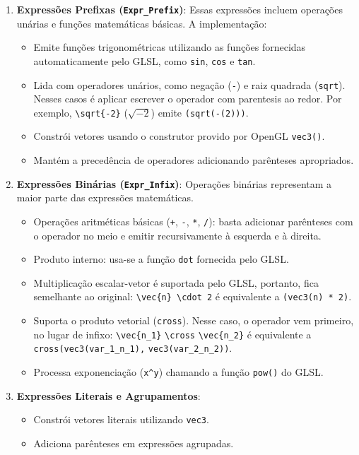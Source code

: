 \begin{enumerate}
    \item \textbf{Expressões Prefixas (\texttt{Expr\_Prefix})}:
    Essas expressões incluem operações unárias e funções matemáticas básicas. A implementação:
    \begin{itemize}
        \item Emite funções trigonométricas utilizando as funções fornecidas automaticamente pelo GLSL, como \verb|sin|, \verb|cos| e \verb|tan|.
        \item Lida com operadores unários, como negação (\verb|-|) e raiz quadrada (\verb|sqrt|). Nesses casos é aplicar escrever o operador com parentesis ao redor. Por exemplo, \verb"\sqrt{-2}" ($\sqrt{-2}$) emite \verb"(sqrt(-(2)))".
        \item Constrói vetores usando o construtor provido por OpenGL \verb|vec3()|.
        \item Mantém a precedência de operadores adicionando parênteses apropriados.
    \end{itemize}

    \item \textbf{Expressões Binárias (\texttt{Expr\_Infix})}:
    Operações binárias representam a maior parte das expressões matemáticas.
    \begin{itemize}
    \item Operações aritméticas básicas (\verb|+|, \verb|-|, \verb|*|, \verb|/|): basta adicionar parênteses com o operador no meio e emitir recursivamente à esquerda e à direita.
    \item Produto interno: usa-se a função \verb|dot| fornecida pelo GLSL.
    \item Multiplicação escalar-vetor é suportada pelo GLSL, portanto, fica semelhante ao original: \verb|\vec{n} \cdot 2| é equivalente a \verb|(vec3(n) * 2)|.
    \item Suporta o produto vetorial (\verb|cross|). Nesse caso, o operador vem primeiro, no lugar de infixo: \verb|\vec{n_1}| \verb"\cross" \verb"\vec{n_2}" é  equivalente a  \verb|cross(vec3(var_1_n_1),| \verb|vec3(var_2_n_2))|.
    \item Processa exponenciação (\verb|x^y|) chamando a função \verb|pow()| do GLSL.
    \end{itemize}

    \item \textbf{Expressões Literais e Agrupamentos}:
    \begin{itemize}
        \item Constrói vetores literais utilizando \verb|vec3|.
        \item Adiciona parênteses em expressões agrupadas.
    \end{itemize}


\end{enumerate}
